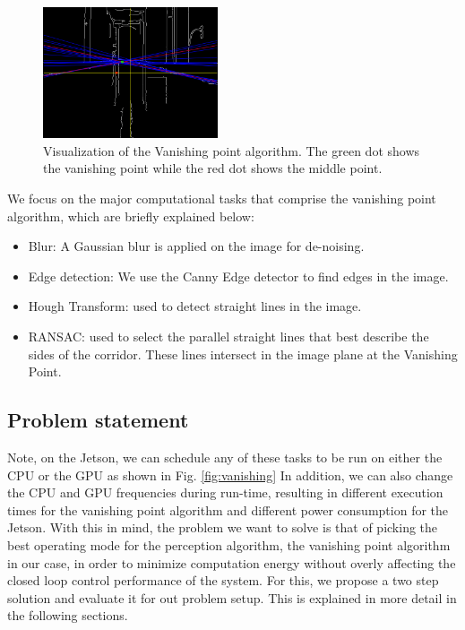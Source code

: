 \begin{figure}[hbtp]
\centering
\includegraphics[width=0.46\textwidth]{Figs/vpmpimages/image_23_-30_-51.png}
\caption{Visualization of the Vanishing point algorithm. The green dot shows the vanishing point while the red dot shows the middle point.}
\label{fig:vp_viz} %
\end{figure}


We focus on the major computational tasks that comprise the vanishing point algorithm, which are briefly explained below:

\begin{itemize}
\item Blur: A Gaussian blur is applied on the image for de-noising.
\item Edge detection: We use the Canny Edge detector to find edges in the image.
\item Hough Transform: used to detect straight lines in the image.
\item RANSAC: used to select the parallel straight lines that best describe the sides of the corridor. These lines intersect in the image plane at the Vanishing Point.
\end{itemize}


\subsection{Problem statement}
Note, on the Jetson, we can schedule any of these tasks to be run on either the CPU or the GPU as shown in Fig. \ref{fig:vanishing} In addition, we can also change the CPU and GPU frequencies during run-time, resulting in different execution times for the vanishing point algorithm and different power consumption for the Jetson. With this in mind, the problem we want to solve is that of picking the best operating mode for the perception algorithm, the vanishing point algorithm in our case, in order to minimize computation energy without overly affecting the closed loop control performance of the system. For this, we propose a two step solution and evaluate it for out problem setup. This is explained in more detail in the following sections.



